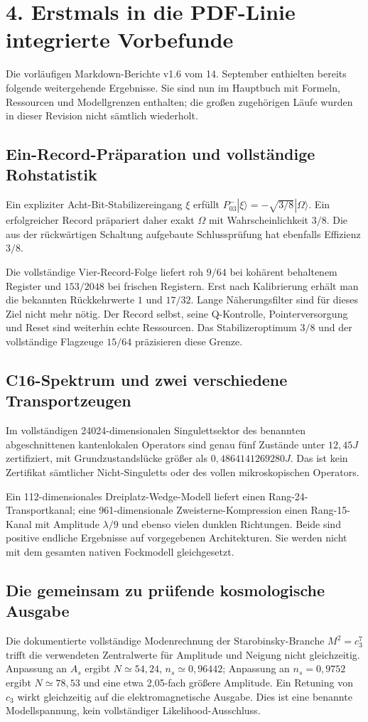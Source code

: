 \chapter*{4. Erstmals in die PDF-Linie integrierte Vorbefunde}
Die vorläufigen Markdown-Berichte v1.6 vom 14. September enthielten bereits folgende weitergehende Ergebnisse. Sie sind nun im Hauptbuch mit Formeln, Ressourcen und Modellgrenzen enthalten; die großen zugehörigen Läufe wurden in dieser Revision nicht sämtlich wiederholt.

\section*{Ein-Record-Präparation und vollständige Rohstatistik}
Ein expliziter Acht-Bit-Stabilizereingang $\xi$ erfüllt $P^-_{03}|\xi\rangle=-\sqrt{3/8}|\Omega\rangle$. Ein erfolgreicher Record präpariert daher exakt $\Omega$ mit Wahrscheinlichkeit $3/8$. Die aus der rückwärtigen Schaltung aufgebaute Schlussprüfung hat ebenfalls Effizienz $3/8$.

Die vollständige Vier-Record-Folge liefert roh $9/64$ bei kohärent behaltenem Register und $153/2048$ bei frischen Registern. Erst nach Kalibrierung erhält man die bekannten Rückkehrwerte $1$ und $17/32$. Lange Näherungsfilter sind für dieses Ziel nicht mehr nötig. Der Record selbst, seine Q-Kontrolle, Pointerversorgung und Reset sind weiterhin echte Ressourcen. Das Stabilizeroptimum $3/8$ und der vollständige Flagzeuge $15/64$ präzisieren diese Grenze.

\section*{C16-Spektrum und zwei verschiedene Transportzeugen}
Im vollständigen 24024-dimensionalen Singulettsektor des benannten abgeschnittenen kantenlokalen Operators sind genau fünf Zustände unter $12{,}45J$ zertifiziert, mit Grundzustandslücke größer als $0{,}4864141269280J$. Das ist kein Zertifikat sämtlicher Nicht-Singuletts oder des vollen mikroskopischen Operators.

Ein 112-dimensionales Dreiplatz-Wedge-Modell liefert einen Rang-24-Transportkanal; eine 961-dimensionale Zweisterne-Kompression einen Rang-15-Kanal mit Amplitude $\lambda/9$ und ebenso vielen dunklen Richtungen. Beide sind positive endliche Ergebnisse auf vorgegebenen Architekturen. Sie werden nicht mit dem gesamten nativen Fockmodell gleichgesetzt.

\section*{Die gemeinsam zu prüfende kosmologische Ausgabe}
Die dokumentierte vollständige Modenrechnung der Starobinsky-Branche $M^2=c_3^7$ trifft die verwendeten Zentralwerte für Amplitude und Neigung nicht gleichzeitig. Anpassung an $A_s$ ergibt $N\simeq54{,}24$, $n_s\simeq0{,}96442$; Anpassung an $n_s=0{,}9752$ ergibt $N\simeq78{,}53$ und eine etwa 2,05-fach größere Amplitude. Ein Retuning von $c_3$ wirkt gleichzeitig auf die elektromagnetische Ausgabe. Dies ist eine benannte Modellspannung, kein vollständiger Likelihood-Ausschluss.


